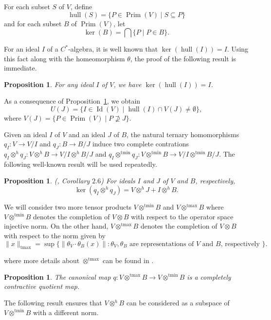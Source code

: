 \documentclass{birkjour}
\newtheorem{prop}[thm]{Proposition}
\theoremstyle{definition}
\theoremstyle{remark}
\numberwithin{equation}{section}
\begin{document}
For each subset \( S \) of \( V \), define  
\[
\operatorname{hull}(S) = \{ P \in \operatorname{Prim}(V) \mid S \subseteq P \}
\]  
and for each subset \( B \) of \( \operatorname{Prim}(V) \), let  
\[
\operatorname{ker}(B) = \bigcap \{ P \mid P \in B \}.
\]  

For an ideal \( I \) of a \( C^{\ast} \)-algebra, it is well known that \( \operatorname{ker}(\operatorname{hull}(I)) = I \). Using this fact along with the homeomorphism \( \theta \), the proof of the following result is immediate.  

\begin{prop}\label{result1}
    For any ideal \( I \) of \( V \), we have \( \operatorname{ker}(\operatorname{hull}(I)) = I \).
\end{prop}  

As a consequence of Proposition~\ref{result1}, we obtain 
\[
U(J) = \{ I \in \operatorname{Id}(V) \mid \operatorname{hull}(I) \cap V(J) \neq \emptyset \},
\]  
where \( V(J) = \{ P \in \operatorname{Prim}(V) \mid P \not\supseteq J \} \).



Given an ideal $I$ of $V$ and an ideal $J$ of $B$, the  natural ternary homomorphisms $q_I: V \to V/I$ and $q_J:B \to B/J$ induce two  complete contrations $q_I \otimes^h q_J : V \otimes^h B \to V/I \otimes^h B/J$ and $q_I \otimes^{\text{tmin}} q_J : V \otimes^{\text{tmin}} B \to V/I \otimes^{\text{tmin}} B/J$. The following well-known result will be used repeatedly.


\begin{prop} (\cite{AS}, Corollary $2.6$) For ideals $I$ and $J$ of $V$ and $B$, respectively, 
     $$\operatorname{ker}(q_I \otimes^h q_J)= V \otimes^h J+ I \otimes^h B.$$
\end{prop}


 We will consider two more tensor products  $V \otimes^{\text{tmin}} B$ and $V \otimes^{\text{tmax}} B$  where $V \otimes^{\text{tmin}} B$ denotes the completion of $V \otimes B$ with respect to the operator space injective norm. On the other hand,  $V \otimes^{\text{tmax}} B$  denotes the completion of $V \otimes B$ with respect to the norm given by  
 \[
\|x \|_{\text{tmax}} = \sup \{\|\theta_V\cdot \theta_B(x)\| : \theta_V, \theta_B \text{ are representations of $V$ and $B$, respectively } \}.\]

where more details about $\otimes^{\text{tmax}}$ can be found in \cite{MK_JR}. 

 \begin{prop}
     The canonical map $q:V \otimes^{\text{tmax}} B \to V \otimes^{\text{tmin}} B $ is a completely contractive quotient map.
 \end{prop}
The following result ensures that $V \otimes^h B$ can be considered as a subspace of $V\otimes^{\text{tmin}} B$ with a different norm.
\end{document}
